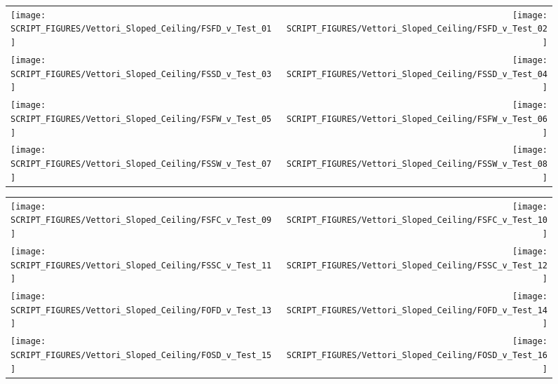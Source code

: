\newpage

\begin{figure}[p]
\begin{tabular*}{\textwidth}{l@{\extracolsep{\fill}}r}
\texttt{[image: SCRIPT\_FIGURES/Vettori\_Sloped\_Ceiling/FSFD\_v\_Test\_01]} &
\texttt{[image: SCRIPT\_FIGURES/Vettori\_Sloped\_Ceiling/FSFD\_v\_Test\_02]} \\
\texttt{[image: SCRIPT\_FIGURES/Vettori\_Sloped\_Ceiling/FSSD\_v\_Test\_03]} &
\texttt{[image: SCRIPT\_FIGURES/Vettori\_Sloped\_Ceiling/FSSD\_v\_Test\_04]} \\
\texttt{[image: SCRIPT\_FIGURES/Vettori\_Sloped\_Ceiling/FSFW\_v\_Test\_05]} &
\texttt{[image: SCRIPT\_FIGURES/Vettori\_Sloped\_Ceiling/FSFW\_v\_Test\_06]} \\
\texttt{[image: SCRIPT\_FIGURES/Vettori\_Sloped\_Ceiling/FSSW\_v\_Test\_07]} &
\texttt{[image: SCRIPT\_FIGURES/Vettori\_Sloped\_Ceiling/FSSW\_v\_Test\_08]} \\
\end{tabular*}
\label{Vettori_Sloped_1}
\end{figure}

\begin{figure}[p]
\begin{tabular*}{\textwidth}{l@{\extracolsep{\fill}}r}
\texttt{[image: SCRIPT\_FIGURES/Vettori\_Sloped\_Ceiling/FSFC\_v\_Test\_09]} &
\texttt{[image: SCRIPT\_FIGURES/Vettori\_Sloped\_Ceiling/FSFC\_v\_Test\_10]} \\
\texttt{[image: SCRIPT\_FIGURES/Vettori\_Sloped\_Ceiling/FSSC\_v\_Test\_11]} &
\texttt{[image: SCRIPT\_FIGURES/Vettori\_Sloped\_Ceiling/FSSC\_v\_Test\_12]} \\
\texttt{[image: SCRIPT\_FIGURES/Vettori\_Sloped\_Ceiling/FOFD\_v\_Test\_13]} &
\texttt{[image: SCRIPT\_FIGURES/Vettori\_Sloped\_Ceiling/FOFD\_v\_Test\_14]} \\
\texttt{[image: SCRIPT\_FIGURES/Vettori\_Sloped\_Ceiling/FOSD\_v\_Test\_15]} &
\texttt{[image: SCRIPT\_FIGURES/Vettori\_Sloped\_Ceiling/FOSD\_v\_Test\_16]} \\
\end{tabular*}
\label{Vettori_Sloped_2}
\end{figure}

